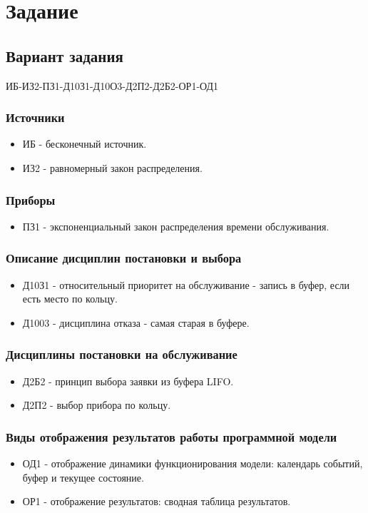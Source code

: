 \documentclass{article}
\begin{document}
	\tableofcontents
	\newpage

	\section{Задание}
	\subsection{Вариант задания}
	ИБ-ИЗ2-ПЗ1-Д10З1-Д10О3-Д2П2-Д2Б2-ОР1-ОД1

	\subsubsection{Источники}
	\begin{itemize}
		\item ИБ - бесконечный источник.
		\item ИЗ2 - равномерный закон распределения.
	\end{itemize}

	\subsubsection{Приборы}
	\begin{itemize}
		\item ПЗ1 - экспоненциальный закон распределения времени обслуживания.
	\end{itemize}

	\subsubsection{Описание дисциплин постановки и выбора}
	\begin{itemize}
		\item Д10З1 - относительный приоритет на обслуживание - запись в буфер, если есть место по кольцу.
		\item Д1003 - дисциплина отказа - самая старая в буфере.
	\end{itemize}

	\subsubsection{Дисциплины постановки на обслуживание}
	\begin{itemize}
		\item Д2Б2 - принцип выбора заявки из буфера LIFO.
		\item Д2П2 - выбор прибора по кольцу.
	\end{itemize}

	\subsubsection{Виды отображения результатов работы программной модели}
	\begin{itemize}
		\item ОД1 - отображение динамики функционирования модели: календарь событий, буфер и текущее состояние.
		\item ОР1 - отображение результатов: сводная таблица результатов.
	\end{itemize}
\end{document}
